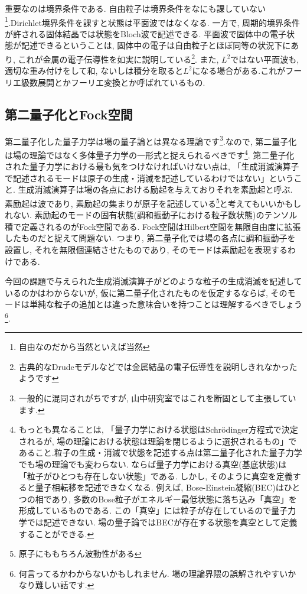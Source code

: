 \documentclass[10.5pt,a4paper]{jreport}
\begin{document}
重要なのは境界条件である. 自由粒子は境界条件をなにも課していない\footnote{自由なのだから当然といえば当然}.Dirichlet境界条件を課すと状態は平面波ではなくなる. 一方で, 周期的境界条件が許される固体結晶では状態をBloch波で記述できる. 平面波で固体中の電子状態が記述できるということは, 固体中の電子は自由粒子とほぼ同等の状況下にあり, これが金属の電子伝導性を如実に説明している\footnote{古典的なDrudeモデルなどでは金属結晶の電子伝導性を説明しきれなかったようです}. また, $L^2$ではない平面波も, 適切な重み付けをして和, ないしは積分を取ると$L^2$になる場合がある.これがフーリエ級数展開とかフーリエ変換とか呼ばれているもの.

\subsection{第二量子化とFock空間}
第二量子化した量子力学は場の量子論とは異なる理論です\footnote{一般的に混同されがちですが, 山中研究室ではこれを断固として主張しています.}.なので, 第二量子化は場の理論ではなく多体量子力学の一形式と捉えられるべきです\footnote{もっとも異なることは, 「量子力学における状態はSchr\"odinger方程式で決定されるが, 場の理論における状態は理論を閉じるように選択されるもの」であること.粒子の生成・消滅で状態を記述する点は第二量子化された量子力学でも場の理論でも変わらない. ならば量子力学における真空(基底状態)は「粒子がひとつも存在しない状態」である. しかし, そのように真空を定義すると量子相転移を記述できなくなる. 例えば, Bose-Einstein凝縮(BEC)はひとつの相であり, 多数のBose粒子がエネルギー最低状態に落ち込み「真空」を形成しているものである. この「真空」には粒子が存在しているので量子力学では記述できない. 場の量子論ではBECが存在する状態を真空として定義することができる.}. 第二量子化された量子力学における最も気をつけなければいけない点は, 「生成消滅演算子で記述されるモードは原子の生成・消滅を記述しているわけではない」ということ. 生成消滅演算子は場の各点における励起を与えておりそれを素励起と呼ぶ. 素励起は波であり, 素励起の集まりが原子を記述している\footnote{原子にももちろん波動性がある}と考えてもいいかもしれない. 素励起のモードの固有状態(調和振動子における粒子数状態)のテンソル積で定義されるのがFock空間である. Fock空間はHilbert空間を無限自由度に拡張したものだと捉えて問題ない. つまり, 第二量子化では場の各点に調和振動子を設置し, それを無限個連結させたものであり, そのモードは素励起を表現するわけである.

今回の課題で与えられた生成消滅演算子がどのような粒子の生成消滅を記述しているのかはわからないが, 仮に第二量子化されたものを仮定するならば, そのモードは単純な粒子の追加とは違った意味合いを持つことは理解するべきでしょう\footnote{何言ってるかわからないかもしれません. 場の理論界隈の誤解されやすいかなり難しい話です.}.
\end{document}
